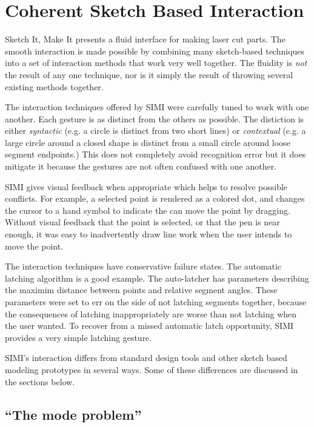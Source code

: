 \section{Coherent Sketch Based Interaction}

Sketch It, Make It presents a fluid interface for making laser cut
parts. The smooth interaction is made possible by combining many
sketch-based techniques into a set of interaction methods that work
very well together. The fluidity is \textit{not} the result of any one
technique, nor is it simply the result of throwing several existing
methods together.

The interaction techniques offered by SIMI were carefully tuned to
work with one another. Each gesture is as distinct from the others as
possible. The distiction is either \textit{syntactic} (e.g. a circle
is distinct from two short lines) or \textit{contextual} (e.g. a large
circle around a closed shape is distinct from a small circle around
loose segment endpoints.) This does not completely avoid recognition
error but it does mitigate it because the gestures are not often
confused with one another.

SIMI gives visual feedback when appropriate which helps to resolve
possible conflicts. For example, a selected point is rendered as a
colored dot, and changes the cursor to a hand symbol to indicate the
can move the point by dragging. Without visual feedback that the point
is selected, or that the pen is near enough, it was easy to
inadvertently draw line work when the user intends to move the point.

The interaction techniques have conservative failure states. The
automatic latching algorithm is a good example. The auto-latcher has
parameters describing the maximim distance between points and relative
segment angles. These parameters were set to err on the side of not
latching segments together, because the consequences of latching
inappropriately are worse than not latching when the user wanted. To
recover from a missed automatic latch opportunity, SIMI provides a
very simple latching gesture.

SIMI's interaction differs from standard design tools and other sketch
based modeling prototypes in several ways. Some of these differences
are discussed in the sections below.

\subsection{``The mode problem''}

